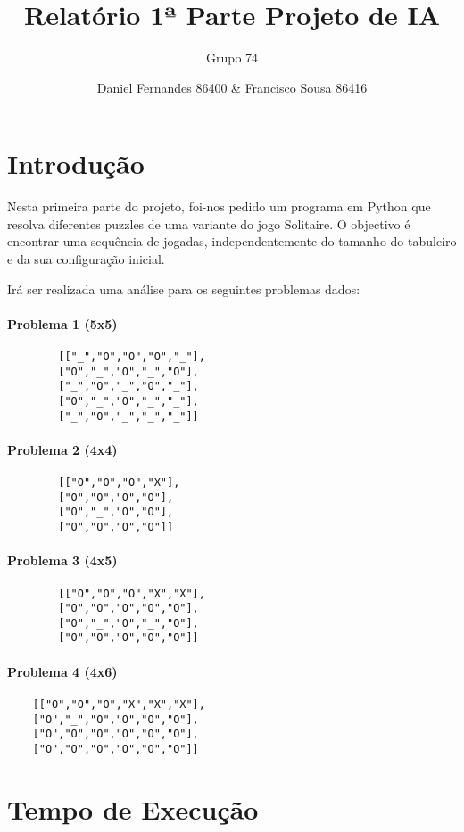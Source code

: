 \documentclass[12pt,a4paper]{article}
\author{Grupo 74 \and Daniel Fernandes 86400 \& Francisco Sousa 86416}
\title{Relatório 1ª Parte Projeto de IA}
\begin{document}
\maketitle

\section{Introdução}
Nesta primeira parte do projeto, foi-nos pedido um programa em Python que resolva
diferentes puzzles de uma variante do jogo Solitaire. O objectivo é encontrar uma sequência de jogadas,
independentemente do tamanho do tabuleiro e da sua configuração inicial.

Irá ser realizada uma análise para os seguintes problemas dados:

\begin{multicols}{2}
	\paragraph{Problema 1 (5x5)}
	\begin{verbatim}
		[["_","O","O","O","_"],
		["O","_","O","_","O"],
		["_","O","_","O","_"],
		["O","_","O","_","_"],
		["_","O","_","_","_"]]
	\end{verbatim}
	\paragraph{Problema 2 (4x4)}
	\begin{verbatim}
		[["O","O","O","X"],
		["O","O","O","O"],
		["O","_","O","O"],
		["O","O","O","O"]]
	\end{verbatim}
	\paragraph{Problema 3 (4x5)}
	\begin{verbatim}
		[["O","O","O","X","X"],
		["O","O","O","O","O"],
		["O","_","O","_","O"],
		["O","O","O","O","O"]]
	\end{verbatim}
	\paragraph{Problema 4 (4x6)}
	\begin{verbatim}
	[["O","O","O","X","X","X"],
	["O","_","O","O","O","O"],
	["O","O","O","O","O","O"],
	["O","O","O","O","O","O"]]
	\end{verbatim}
\end{multicols}

\section{Tempo de Execução}
\end{document}
